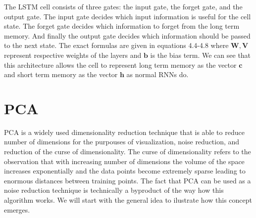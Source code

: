 
The \ac{LSTM} cell consists of three gates: the input gate, the forget gate, and the output gate.
The input gate decides which input information is useful for the cell state. 
The forget gate decides which information to forget from the long term memory.
And finally the output gate decides which information should be passed to the next state.
The exact formulas are given in equations 4.4-4.8 where $\mathbf{W}, \mathbf{V}$ 
represent respective weights of the layers and $\mathbf{b}$ is the bias term. 
We can see that this architecture allows the cell to represent long term
memory as the vector $\textbf{c}$ and short term memory
as the vector $\textbf{h}$ as normal \ac{RNN}s do. 







\section{\acl{PCA}}

\ac{PCA} is a widely used dimensionality reduction technique that is able
to reduce number of dimensions for the purpouses of visualization, noise reduction, and
reduction of the curse of dimensionality. The curse of 
dimensionality refers to the observation that with increasing number of 
dimensions the volume of the space increases exponentially and the data points become
extremely sparse leading to enormous distances between training points.
The fact that \ac{PCA} can be used as a noise reduction technique is 
technically a byproduct of the way how this algorithm works. We will start with the
general idea to ilustrate how this concept emerges.


